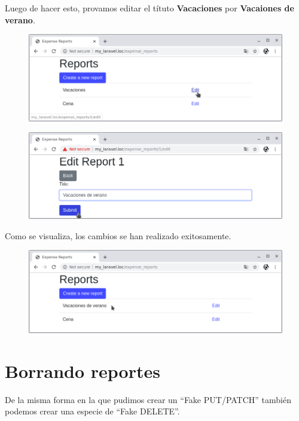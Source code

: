 \documentclass{article}
\begin{document}
Luego de hacer esto, provamos editar el títuto \textbf{Vacaciones} por
\textbf{Vacaiones de verano}.\\

\begin{figure}[h!]
  \centering
  \includegraphics[scale=0.5]{./Pictures/074_edit_vacaciones.png}
\end{figure}

\begin{figure}[h!]
  \centering
  \includegraphics[scale=0.5]{./Pictures/075_vacaciones_verano.png}
\end{figure}

Como se visualiza, los cambios se han realizado exitosamente.

\begin{figure}[h!]
  \centering
  \includegraphics[scale=0.5]{./Pictures/076_update_ok.png}
\end{figure}





\section{Borrando reportes}%
De la misma forma en la que pudimos crear un “Fake PUT/PATCH” también podemos
crear una especie de “Fake DELETE”.\\
\end{document}
